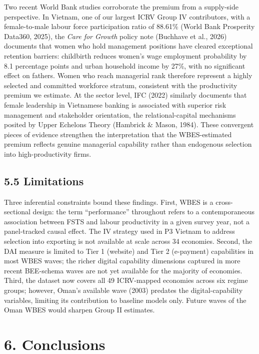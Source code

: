 \documentclass[
  12pt]{article}
\begin{document}
Two recent World Bank studies corroborate the premium from a supply-side
perspective. In Vietnam, one of our largest ICRV Group IV contributors,
with a female-to-male labour force participation ratio of 88.61\% (World
Bank Prosperity Data360, 2025), the \emph{Care for Growth} policy note
(Buchhave et al., 2026) documents that women who hold management
positions have cleared exceptional retention barriers: childbirth
reduces women's wage employment probability by 8.1 percentage points and
urban household income by 27\%, with no significant effect on fathers.
Women who reach managerial rank therefore represent a highly selected
and committed workforce stratum, consistent with the productivity
premium we estimate. At the sector level, IFC (2022) similarly documents
that female leadership in Vietnamese banking is associated with superior
risk management and stakeholder orientation, the relational-capital
mechanisms posited by Upper Echelons Theory (Hambrick \& Mason, 1984).
These convergent pieces of evidence strengthen the interpretation that
the WBES-estimated premium reflects genuine managerial capability rather
than endogenous selection into high-productivity firms.

\hypertarget{limitations}{%
\subsection{5.5 Limitations}\label{limitations}}

Three inferential constraints bound these findings. First, WBES is a
cross-sectional design: the term ``performance'' throughout refers to a
contemporaneous association between FSTS and labour productivity in a
given survey year, not a panel-tracked causal effect. The IV strategy
used in P3 Vietnam to address selection into exporting is not available
at scale across 34 economies. Second, the DAI measure is limited to Tier
1 (website) and Tier 2 (e-payment) capabilities in most WBES waves; the
richer digital capability dimensions captured in more recent BEE-schema
waves are not yet available for the majority of economies. Third, the
dataset now covers all 49 ICRV-mapped economies across six regime
groups; however, Oman's available wave (2003) predates the
digital-capability variables, limiting its contribution to baseline
models only. Future waves of the Oman WBES would sharpen Group II
estimates.

\hypertarget{conclusions}{%
\section{6. Conclusions}\label{conclusions}}
\end{document}
